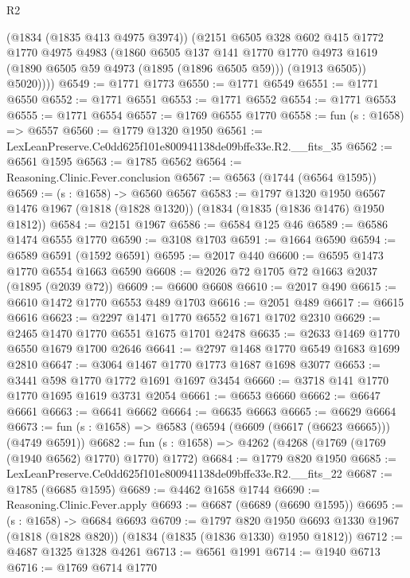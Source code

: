 \begin{lexlean}{R2}
\begin{coremodule}
          (@1834 (@1835 @413 @4975 @3974))
          (@2151
            @6505
            @328
            @602
            @415
            @1772
            @1770
            @4975
            @4983
            (@1860
              @6505
              @137
              @141
              @1770
              @1770
              @4973
              @1619
              (@1890 @6505 @59 @4973 (@1895 (@1896 @6505 @59)))
              (@1913 @6505))
            @5020))))
@6549 := @1771 @1773
@6550 := @1771 @6549
@6551 := @1771 @6550
@6552 := @1771 @6551
@6553 := @1771 @6552
@6554 := @1771 @6553
@6555 := @1771 @6554
@6557 := @1769 @6555 @1770
@6558 := fun (s : @1658) => @6557
@6560 := @1779 @1320 @1950
@6561 := LexLeanPreserve.Ce0dd625f101e800941138de09bffe33e.R2.__fits_35
@6562 := @6561 @1595
@6563 := @1785 @6562
@6564 := Reasoning.Clinic.Fever.conclusion
@6567 := @6563 (@1744 (@6564 @1595))
@6569 := (s : @1658) -> @6560 @6567
@6583 := @1797
    @1320
    @1950
    @6567
    @1476
    @1967
    (@1818 (@1828 @1320))
    (@1834 (@1835 (@1836 @1476) @1950 @1812))
@6584 := @2151 @1967
@6586 := @6584 @125 @46
@6589 := @6586 @1474 @6555 @1770
@6590 := @3108 @1703
@6591 := @1664 @6590
@6594 := @6589 @6591 (@1592 @6591)
@6595 := @2017 @440
@6600 := @6595 @1473 @1770 @6554 @1663 @6590
@6608 := @2026 @72 @1705 @72 @1663 @2037 (@1895 (@2039 @72))
@6609 := @6600 @6608
@6610 := @2017 @490
@6615 := @6610 @1472 @1770 @6553 @489 @1703
@6616 := @2051 @489
@6617 := @6615 @6616
@6623 := @2297 @1471 @1770 @6552 @1671 @1702 @2310
@6629 := @2465 @1470 @1770 @6551 @1675 @1701 @2478
@6635 := @2633 @1469 @1770 @6550 @1679 @1700 @2646
@6641 := @2797 @1468 @1770 @6549 @1683 @1699 @2810
@6647 := @3064 @1467 @1770 @1773 @1687 @1698 @3077
@6653 := @3441 @598 @1770 @1772 @1691 @1697 @3454
@6660 := @3718 @141 @1770 @1770 @1695 @1619 @3731 @2054
@6661 := @6653 @6660
@6662 := @6647 @6661
@6663 := @6641 @6662
@6664 := @6635 @6663
@6665 := @6629 @6664
@6673 := fun (s : @1658) => @6583 (@6594 (@6609 (@6617 (@6623 @6665))) (@4749 @6591))
@6682 := fun (s : @1658) => @4262 (@4268 (@1769 (@1769 (@1940 @6562) @1770) @1770) @1772)
@6684 := @1779 @820 @1950
@6685 := LexLeanPreserve.Ce0dd625f101e800941138de09bffe33e.R2.__fits_22
@6687 := @1785 (@6685 @1595)
@6689 := @4462 @1658 @1744
@6690 := Reasoning.Clinic.Fever.apply
@6693 := @6687 (@6689 (@6690 @1595))
@6695 := (s : @1658) -> @6684 @6693
@6709 := @1797
    @820
    @1950
    @6693
    @1330
    @1967
    (@1818 (@1828 @820))
    (@1834 (@1835 (@1836 @1330) @1950 @1812))
@6712 := @4687 @1325 @1328 @4261
@6713 := @6561 @1991
@6714 := @1940 @6713
@6716 := @1769 @6714 @1770

\end{coremodule}
\end{lexlean}
